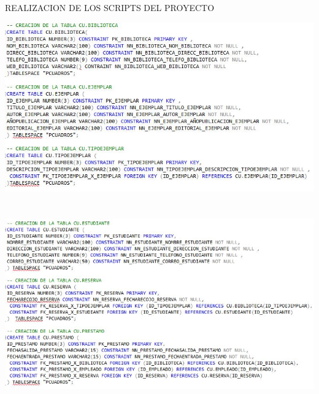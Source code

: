 \documentclass{article}
\begin{document}
\begin{itemize}
	
	\begin{center}
	    REALIZACION DE LOS SCRIPTS DEL PROYECTO\\
	\end{center}
		\begin{center}
		\includegraphics[width=15cm]{./Imagenes/ImagenScript1}\\
		\\\\
		\includegraphics[width=15cm]{./Imagenes/ImagenScript2} 
		\end{center}
		
	\end{itemize} 
	
\end{document}
